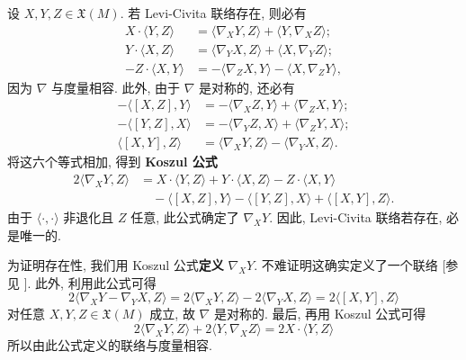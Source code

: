 \begin{RiemannProof}
设 $X,Y,Z\in\mathfrak{X}(M)$. 若 Levi-Civita 联络存在, 则必有
\begin{align*}
  X\cdot\langle Y,Z\rangle &= \langle\nabla_XY,Z\rangle+\langle Y,\nabla_XZ\rangle;\\
  Y\cdot\langle X,Z\rangle &= \langle\nabla_YX,Z\rangle+\langle X,\nabla_YZ\rangle;\\
  -Z\cdot\langle X,Y\rangle &= -\langle\nabla_ZX,Y\rangle-\langle X,\nabla_ZY\rangle,
\end{align*}
因为 $\nabla$ 与度量相容. 此外, 由于 $\nabla$ 是对称的, 还必有
\begin{align*}
  -\langle[X,Z],Y\rangle &= -\langle\nabla_XZ,Y\rangle+\langle\nabla_ZX,Y\rangle;\\
  -\langle[Y,Z],X\rangle &= -\langle\nabla_YZ,X\rangle+\langle\nabla_ZY,X\rangle;\\
  \langle[X,Y],Z\rangle &= \langle\nabla_XY,Z\rangle-\langle\nabla_YX,Z\rangle.
\end{align*}
将这六个等式相加, 得到 \textbf{Koszul 公式}
\begin{align*}
  2\langle\nabla_XY,Z\rangle
    &= X\cdot\langle Y,Z\rangle+Y\cdot\langle X,Z\rangle-Z\cdot\langle X,Y\rangle\\
    &\quad-\langle[X,Z],Y\rangle-\langle[Y,Z],X\rangle+\langle[X,Y],Z\rangle.
\end{align*}
由于 $\langle\cdot,\cdot\rangle$ 非退化且 $Z$ 任意, 此公式确定了 $\nabla_XY$. 因此, Levi-Civita 联络若存在, 必是唯一的.

为证明存在性, 我们用 Koszul 公式\textbf{定义} $\nabla_XY$. 不难证明这确实定义了一个联络 [参见 ]. 此外, 利用此公式可得
\[
  2\langle\nabla_XY-\nabla_YX,Z\rangle
  =2\langle\nabla_XY,Z\rangle-2\langle\nabla_YX,Z\rangle=2\langle[X,Y],Z\rangle
\]
对任意 $X,Y,Z\in\mathfrak{X}(M)$ 成立, 故 $\nabla$ 是对称的. 最后, 再用 Koszul 公式可得
\[
  2\langle\nabla_XY,Z\rangle+2\langle Y,\nabla_XZ\rangle=2X\cdot\langle Y,Z\rangle
\]
所以由此公式定义的联络与度量相容.


\end{RiemannProof}
